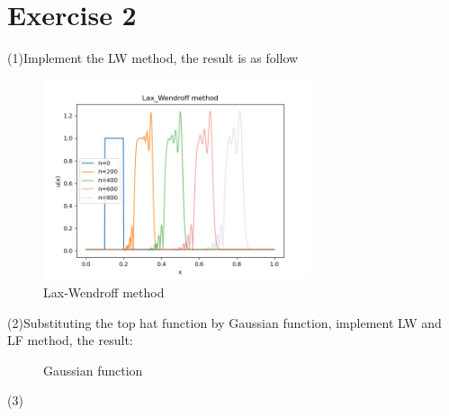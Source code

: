 \documentclass[aps,12pt,prd,nofootinbib,bibnotes, amsmath,amssymb,showpacs,superscriptaddress,floatfix]{revtex4-2}
\begin{document}
\section{Exercise 2}
(1)Implement the LW method, the result is as follow
\begin{figure}[H] 
\centering 
\includegraphics[width=0.7\textwidth]{LW_method} 
\caption{Lax-Wendroff method}  
\end{figure}

(2)Substituting the top hat function by Gaussian function, implement LW and LF method, the result:
\begin{figure}[H]
\centering  
{}
\caption{Gaussian function}
\end{figure}

(3)
\end{document}

